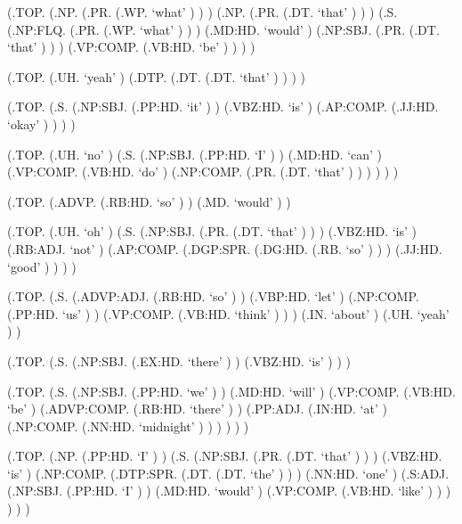 \documentclass[10pt]{article}
\begin{document}
\begin{parsetree}  (.TOP. (.NP. (.PR. (.WP. `what' ) ) ) (.NP. (.PR. (.DT. `that' ) ) ) (.S. (.NP:FLQ. (.PR. (.WP. `what' ) ) ) (.MD:HD. `would' ) (.NP:SBJ. (.PR. (.DT. `that' ) ) ) (.VP:COMP. (.VB:HD. `be' ) ) ) ) \end{parsetree}

\begin{parsetree}  (.TOP. (.UH. `yeah' ) (.DTP. (.DT. (.DT. `that' ) ) ) ) \end{parsetree}

\begin{parsetree}  (.TOP. (.S. (.NP:SBJ. (.PP:HD. `it' ) ) (.VBZ:HD. `is' ) (.AP:COMP. (.JJ:HD. `okay' ) ) ) ) \end{parsetree}

\begin{parsetree}  (.TOP. (.UH. `no' ) (.S. (.NP:SBJ. (.PP:HD. `I' ) ) (.MD:HD. `can' ) (.VP:COMP. (.VB:HD. `do' ) (.NP:COMP. (.PR. (.DT. `that' ) ) ) ) ) ) \end{parsetree}

\begin{parsetree}  (.TOP. (.ADVP. (.RB:HD. `so' ) ) (.MD. `would' ) ) \end{parsetree}

\begin{parsetree}  (.TOP. (.UH. `oh' ) (.S. (.NP:SBJ. (.PR. (.DT. `that' ) ) ) (.VBZ:HD. `is' ) (.RB:ADJ. `not' ) (.AP:COMP. (.DGP:SPR. (.DG:HD. (.RB. `so' ) ) ) (.JJ:HD. `good' ) ) ) ) \end{parsetree}

\begin{parsetree}  (.TOP. (.S. (.ADVP:ADJ. (.RB:HD. `so' ) ) (.VBP:HD. `let' ) (.NP:COMP. (.PP:HD. `us' ) ) (.VP:COMP. (.VB:HD. `think' ) ) ) (.IN. `about' ) (.UH. `yeah' ) ) \end{parsetree}

\begin{parsetree}  (.TOP. (.S. (.NP:SBJ. (.EX:HD. `there' ) ) (.VBZ:HD. `is' ) ) ) \end{parsetree}

\begin{parsetree}  (.TOP. (.S. (.NP:SBJ. (.PP:HD. `we' ) ) (.MD:HD. `will' ) (.VP:COMP. (.VB:HD. `be' ) (.ADVP:COMP. (.RB:HD. `there' ) ) (.PP:ADJ. (.IN:HD. `at' ) (.NP:COMP. (.NN:HD. `midnight' ) ) ) ) ) ) \end{parsetree}

\begin{parsetree}  (.TOP. (.NP. (.PP:HD. `I' ) ) (.S. (.NP:SBJ. (.PR. (.DT. `that' ) ) ) (.VBZ:HD. `is' ) (.NP:COMP. (.DTP:SPR. (.DT. (.DT. `the' ) ) ) (.NN:HD. `one' ) (.S:ADJ. (.NP:SBJ. (.PP:HD. `I' ) ) (.MD:HD. `would' ) (.VP:COMP. (.VB:HD. `like' ) ) ) ) ) ) \end{parsetree}
\end{document}
